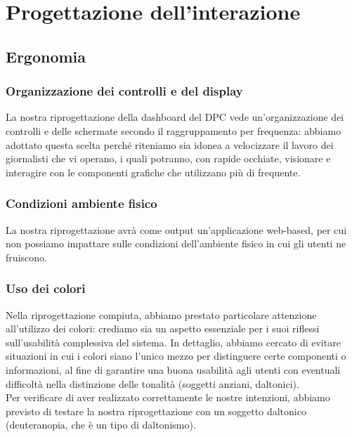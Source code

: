 \section{Progettazione dell'interazione}
\label{s:approccio-interaction-design}

\subsection{Ergonomia}
\label{ss:ergonomia}

\subsubsection{Organizzazione dei controlli e del display}
\label{sss:organizzazione-controlli-display}
La nostra riprogettazione della dashboard del DPC vede un'organizzazione dei controlli e delle schermate secondo il raggruppamento per frequenza: abbiamo adottato questa scelta perché riteniamo sia idonea a velocizzare il lavoro dei giornalisti che vi operano, i quali potranno, con rapide occhiate, visionare e interagire con le componenti grafiche che utilizzano più di frequente.

\subsubsection{Condizioni ambiente fisico}
\label{sss:condizioni-ambiente-fisico}
La nostra riprogettazione avrà come output un'applicazione web-based, per cui non possiamo impattare sulle condizioni dell'ambiente fisico in cui gli utenti ne fruiscono.

\subsubsection{Uso dei colori}
\label{sss:uso-colori}
Nella riprogettazione compiuta, abbiamo prestato particolare attenzione all'utilizzo dei colori: crediamo sia un aspetto essenziale per i suoi riflessi sull'usabilità complessiva del sistema. In dettaglio, abbiamo cercato di evitare situazioni in cui i colori siano l'unico mezzo per distinguere certe componenti o informazioni, al fine di garantire una buona usabilità agli utenti con eventuali difficoltà nella distinzione delle tonalità (soggetti anziani, daltonici).\\
Per verificare di aver realizzato correttamente le nostre intenzioni, abbiamo previsto di testare la nostra riprogettazione con un soggetto daltonico (deuteranopia, che è un tipo di daltonismo).  

